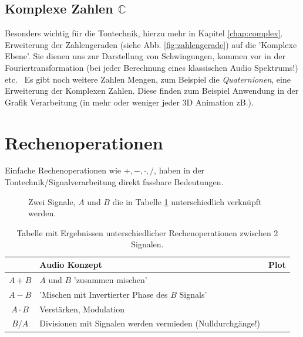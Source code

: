 \subsection{Komplexe Zahlen $\mathbb{C}$}
Besonders wichtig für die Tontechnik, hierzu mehr in Kapitel \ref{chap:complex}. Erweiterung der Zahlengeraden (siehe Abb. \ref{fig:zahlengerade}) auf die 'Komplexe Ebene'. Sie dienen uns zur Darstellung von Schwingungen, kommen vor in der Fouriertransformation (bei jeder Berechnung eines klassischen Audio Spektrums!) etc. \
Es gibt noch weitere Zahlen Mengen, zum Beispiel die \emph{Quaternionen}, eine Erweiterung der Komplexen Zahlen. Diese finden zum Beispiel Anwendung in der Grafik Verarbeitung (in mehr oder weniger jeder 3D Animation zB.). 



\section{Rechenoperationen}

Einfache Rechenoperationen wie $+, -, \cdot, / $, haben in der Tontechnik/Signalverarbeitung direkt fassbare Bedeutungen.


\begin{figure}[h!]
    \centering
        
    \caption{Zwei Signale, $A$ und $B$ die in Tabelle \ref{tab:rechen} unterschiedlich verknüpft werden.}
    \label{fig:signale}
\end{figure}

\begin{table}
\begin{center}
\begin{tabular}{|c|p{5cm}|c|}
    \hline
    \textbf{} & \textbf{Audio Konzept} & \textbf{Plot} \\
    \hline
    $A + B$ & $A$ und $B$ 'zusammen mischen' &  \\
    \hline
    $A - B$ & 'Mischen mit Invertierter Phase des $B$ Signals'&  \\
    \hline
    $A \cdot B$ & Verstärken, Modulation &  \\
    \hline
    $B / A$ & Divisionen mit Signalen werden vermieden (Nulldurchgänge!) &  \\
    \hline
\end{tabular}
\caption{Tabelle mit Ergebnissen unterschiedlicher Rechenoperationen zwischen 2 Signalen.}
\label{tab:rechen}
\end{center}
\end{table}

